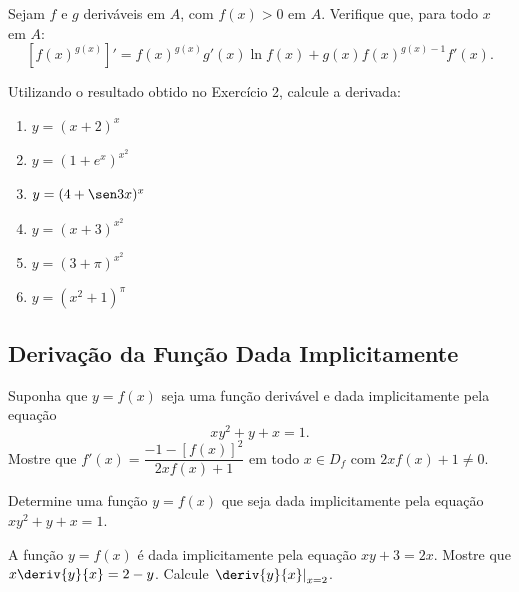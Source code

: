 \begin{exercicio}[2]
\label{ex:7.12.2}
Sejam $f$ e $g$ deriváveis em $A$, com $f(x) > 0$ em $A$. Verifique que, para todo $x$ em $A$:
\[
[f(x)^{g(x)}]' = f(x)^{g(x)} g'(x) \ln f(x) + g(x) f(x)^{g(x) - 1} f'(x).
\]
\end{exercicio}

\begin{exercicio}[3]
\label{ex:7.12.3}
Utilizando o resultado obtido no Exercício 2, calcule a derivada:
\begin{enumerate}[label=\alph*)]
    \item $y = (x + 2)^x$
    \item $y = (1 + e^x)^{x^2}$
    \item $y = (4 + \sen 3x)^x$
    \item $y = (x + 3)^{x^2}$
    \item $y = (3 + \pi)^{x^2}$
    \item $y = (x^2 + 1)^\pi$
\end{enumerate}
\end{exercicio}

\clearpage

\subsection{Derivação da Função Dada Implicitamente}

\begin{exercicio}[1]
\label{ex:7.13.1}
Suponha que $y = f(x)$ seja uma função derivável e dada implicitamente pela equação
\[
xy^2 + y + x = 1.
\]
Mostre que $f'(x) = \dfrac{-1 - [f(x)]^2}{2xf(x) + 1}$ em todo $x \in D_f$ com $2xf(x) + 1 \neq 0$.
\end{exercicio}

\begin{exercicio}[2]
\label{ex:7.13.2}
Determine uma função $y = f(x)$ que seja dada implicitamente pela equação $xy^2 + y + x = 1$.
\end{exercicio}

\begin{exercicio}[3]
\label{ex:7.13.3}
A função $y = f(x)$ é dada implicitamente pela equação $xy + 3 = 2x$. Mostre que $x\deriv{y}{x} = 2 - y$. Calcule $\left.\deriv{y}{x}\right|_{x = 2}$.
\end{exercicio}

